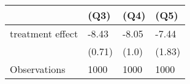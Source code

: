 \begin{tabular}{llll}
\toprule
{} &    (Q3) &   (Q4) &    (Q5) \\
\midrule
treatment effect &   -8.43 &  -8.05 &   -7.44 \\
                 &  (0.71) &  (1.0) &  (1.83) \\
Observations     &    1000 &   1000 &    1000 \\
\bottomrule
\end{tabular}
